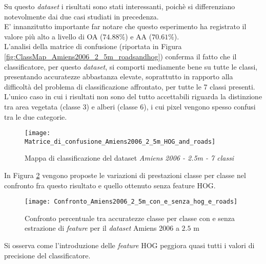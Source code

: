 Su questo \emph{dataset} i risultati sono stati interessanti, poichè
si differenziano notevolmente dai due casi studiati in precedenza.\\

E' innanzitutto importante far notare che questo esperimento ha
registrato il valore più alto a livello di OA ($74.88\%$) e AA
($70.61\%$). \\

L'analisi della matrice di confusione (riportata in Figura
\ref{fig:ClassMap_Amiens2006_2_5m_roadsandhog}) conferma il fatto che
il classificatore, per questo \emph{dataset}, si comporti mediamente
bene su tutte le classi, presentando accuratezze abbastanza elevate,
soprattutto in rapporto alla difficoltà del problema di
classificazione affrontato, per tutte le 7 classi presenti.\\L'unico
caso in cui i risultati non sono del tutto accettabili riguarda la
distinzione tra area vegetata (classe 3) e alberi (classe 6), i cui
pixel vengono spesso confusi tra le due categorie.

\begin{figure}[!ht]

\texttt{[image: Matrice\_di\_confusione\_Amiens2006\_2\_5m\_HOG\_and\_roads]}

\caption{Mappa di classificazione del dataset \emph{Amiens 2006 - 2.5m
- 7 classi}}

\label{fig:Matrice_di_confusione_Amiens2006_2_5m_HOG_and_roads}

\end{figure}

In Figura \ref{fig:Confronto_Amiens2006_2_5m_con_e_senza_hog_e_roads}
vengono proposte le variazioni di prestazioni classe per classe nel
confronto fra questo risultato e quello ottenuto senza feature HOG.\\

\begin{figure}[!ht]

\texttt{[image: Confronto\_Amiens2006\_2\_5m\_con\_e\_senza\_hog\_e\_roads]}

\caption{Confronto percentuale tra accuratezze classe per classe con e
senza estrazione di \emph{feature} per il \emph{dataset} Amiens 2006 a
$2.5$ m}

\label{fig:Confronto_Amiens2006_2_5m_con_e_senza_hog_e_roads}

\end{figure}

Si osserva come l'introduzione delle \emph{feature} HOG peggiora quasi
tutti i valori di precisione del classificatore.\\

